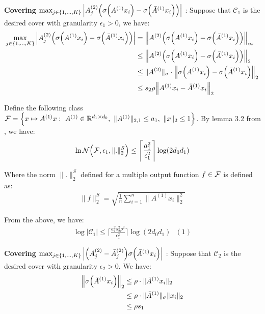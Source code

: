 \noindent\textbf{Covering $\max_{j\in\{1, \dots, K\}}\Big| A_j^{(2)}\Big( \sigma\Big( A^{(1)}x_i \Big) -\sigma\Big( \bar A^{(1)}x_i \Big) \Big) \Big|$} : Suppose that $\mathcal{C}_1$ is the desired cover with granularity $\epsilon_1>0$, we have:
\begin{align*}
    \max_{j\in\{1, \dots, K\}} \Big| 
        A_j^{(2)}\Big( \sigma\Big( A^{(1)}x_i \Big) -\sigma\Big( \bar A^{(1)}x_i \Big) \Big)
     \Big| &= \Big\|A^{(2)} \Big( \sigma\Big( A^{(1)}x_i \Big) -\sigma\Big( \bar A^{(1)}x_i \Big) \Big)\Big\|_\infty \\
    &\le \Big\|A^{(2)} \Big( \sigma\Big( A^{(1)}x_i \Big) -\sigma\Big( \bar A^{(1)}x_i \Big) \Big)\Big\|_2 \\
    &\le \|A^{(2)}\|_\sigma \cdot \Big\| \sigma\Big( A^{(1)}x_i \Big) -\sigma\Big( \bar A^{(1)}x_i \Big) \Big\|_2 \\
    &\le s_2 \rho \Big\|A^{(1)}x_i - \bar A^{(1)}x_i \Big\|_2
\end{align*}

\noindent Define the following class $\mathcal{F}=\Big\{ x\mapsto A^{(1)}x : \ A^{(1)}\in \mathbb{R}^{d_1\times d_0}, \ \|A^{(1)}\|_{2, 1} \le a_1, \ \|x\|_2 \le 1 \Big\}$. By lemma 3.2 from \cite{article:bartlett}, we have:
\begin{align*}
    \ln \mathcal{N}\Big( 
        \mathcal{F}, \epsilon_1, \|.\|_2^S
     \Big) \le \Bigg\lceil\frac{a_1^2}{\epsilon_1^2}\Bigg\rceil \log(2d_0d_1)
\end{align*}

\noindent Where the norm $\|.\|_2^S$ defined for a multiple output function $f\in\mathcal{F}$ is defined as:
\begin{align*}
    \|f\|_2^S = \sqrt{
        \frac{1}{n}\sum_{i=1}^n \|A^{(1)}x_i\|_2^2
    }
\end{align*}

\noindent From the above, we have:
\begin{align*}
    \log|\mathcal{C}_1| \le \Bigg\lceil \frac{a_1^2s_2^2\rho^2}{\epsilon_1^2}\Bigg\rceil\log(2d_0d_1) \ \ \ (1)
\end{align*}

\noindent\newline\textbf{Covering $\max_{j\in\{1, \dots, K\}}\Big| \Big( A_j^{(2)} - \bar A_j^{(2)} \Big)\sigma\Big( \bar A^{(1)}x_i \Big) \Big|$} : Suppose that $\mathcal{C}_2$ is the desired cover with granularity $\epsilon_2>0$. We have:
\begin{align*}
    \Big\|\sigma\Big( \bar A^{(1)}x_i \Big)\Big\|_2
    &\le \rho \cdot \|\bar A^{(1)} x_i \|_2 \\
    &\le \rho \cdot \|\bar A^{(1)}\|_\sigma \|x_i\|_2 \\
    &\le \rho s_1
\end{align*}

